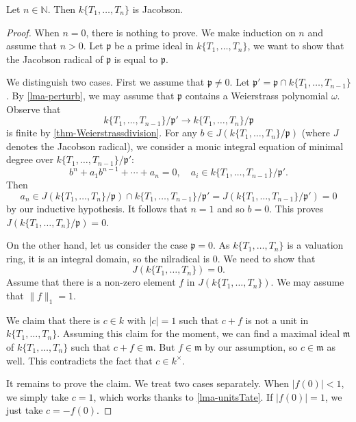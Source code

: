 \begin{proposition}\label{prop-TateJacobson}
    Let $n\in \mathbb{N}$. Then $k\{T_1,\ldots,T_n\}$ is Jacobson.
\end{proposition}
\begin{proof}
    When $n=0$, there is nothing to prove. We make induction on $n$ and assume that $n>0$. Let $\mathfrak{p}$ be a prime ideal in $k\{T_1,\ldots,T_n\}$, we want to show that the Jacobson radical of $\mathfrak{p}$ is equal to $\mathfrak{p}$. 
    
    We distinguish two cases. First we assume that $\mathfrak{p}\neq 0$. Let $\mathfrak{p}'=\mathfrak{p}\cap k\{T_1,\ldots,T_{n-1}\}$. By \cref{lma-perturb}, we may assume that $\mathfrak{p}$ contains a Weierstrass polynomial $\omega$. Observe that
    \[
        k\{T_1,\ldots,T_{n-1}\}/\mathfrak{p}'\rightarrow k\{T_1,\ldots,T_n\}/\mathfrak{p}
    \]
    is finite by \cref{thm-Weierstrassdivision}. For any $b\in J(k\{T_1,\ldots,T_n\}/\mathfrak{p})$ (where $J$ denotes the Jacobson radical), we consider a monic integral equation of minimal degree over $k\{T_1,\ldots,T_{n-1}\}/\mathfrak{p}'$:
    \[
        b^n+a_1b^{n-1}+\cdots+a_n=0,\quad a_i\in   k\{T_1,\ldots,T_{n-1}\}/\mathfrak{p}'.
    \]
    Then
    \[
        a_n\in J(k\{T_1,\ldots,T_{n}\}/\mathfrak{p})\cap k\{T_1,\ldots,T_{n-1}\}/\mathfrak{p}'=J(k\{T_1,\ldots,T_{n-1}\}/\mathfrak{p}')=0
    \]
    by our inductive hypothesis. It follows that $n=1$ and so $b=0$. This proves $J(k\{T_1,\ldots,T_{n}\}/\mathfrak{p})=0$.

    On the other hand, let us consider the case $\mathfrak{p}=0$. As $k\{T_1,\ldots,T_n\}$ is a valuation ring, it is an integral domain, so the nilradical is $0$. We need to show that
    \[
        J(k\{T_1,\ldots,T_n\})=0.  
    \]
    Assume that there is a non-zero element $f$ in $J(k\{T_1,\ldots,T_n\})$. We may assume that $\|f\|_1=1$. 
    
    We claim that there is $c\in k$ with $|c|=1$ such that $c+f$ is not a unit in $k\{T_1,\ldots,T_n\}$. Assuming this claim for the moment, we can find a maximal ideal $\mathfrak{m}$ of $k\{T_1,\ldots,T_n\}$ such that $c+f\in \mathfrak{m}$. But $f\in \mathfrak{m}$ by our assumption, so $c\in \mathfrak{m}$ as well. This contradicts the fact that $c\in k^{\times}$.
    
    It remains to prove the claim. We treat two cases separately. When $|f(0)|<1$, we simply take $c=1$, which works thanks to \cref{lma-unitsTate}.
    If $|f(0)|=1$, we just take $c=-f(0)$.
\end{proof}

